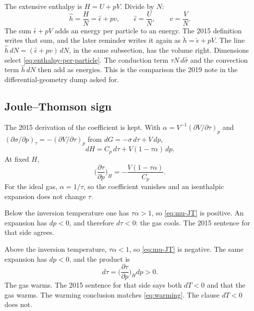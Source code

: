 The extensive enthalpy is \(H = U + pV\). Divide by \(N\):
\begin{equation}
\label{eq:enthalpy-per-particle}
\hat h = \frac{H}{N} = \hat\epsilon + p v,
\qquad
\hat\epsilon = \frac{U}{N},
\qquad
v = \frac{V}{N}.
\end{equation}
The sum \(\hat\epsilon + pV\) adds an energy per particle to an energy. The 2015 definition writes that sum, and the later reminder writes it again as \(\check h = \check\epsilon + pV\). The line \(\hat h\, dN = (\hat\epsilon + pv)\, dN\), in the same subsection, has the volume right. Dimensions select \eqref{eq:enthalpy-per-particle}. The conduction term \(\tau N\, d\hat\sigma\) and the convection term \(\hat h\, dN\) then add as energies. This is the comparison the 2019 note in the differential-geometry dump asked for.

\subsection{Joule--Thomson sign}
\label{sec:jt-sign}

The 2015 derivation of the coefficient is kept. With \(\alpha = V^{-1}(\partial V/\partial\tau)_{p}\) and \((\partial\sigma/\partial p)_{\tau} = -(\partial V/\partial\tau)_{p}\) from \(dG = -\sigma\, d\tau + V\, dp\),
\begin{equation}
\label{eq:dH-JT}
dH = C_p\, d\tau + V(1 - \tau\alpha)\, dp.
\end{equation}
At fixed \(H\),
\begin{equation}
\label{eq:mu-JT}
\biggl(\frac{\partial\tau}{\partial p}\biggr)_{H}
= -\frac{V(1-\tau\alpha)}{C_p}.
\end{equation}
For the ideal gas, \(\alpha = 1/\tau\), so the coefficient vanishes and an isenthalpic expansion does not change \(\tau\).

Below the inversion temperature one has \(\tau\alpha > 1\), so \eqref{eq:mu-JT} is positive. An expansion has \(dp<0\), and therefore \(d\tau<0\): the gas cools. The 2015 sentence for that side agrees.

Above the inversion temperature, \(\tau\alpha < 1\), so \eqref{eq:mu-JT} is negative. The same expansion has \(dp<0\), and the product is
\begin{equation}
\label{eq:warming}
d\tau = \biggl(\frac{\partial\tau}{\partial p}\biggr)_{H} dp > 0.
\end{equation}
The gas warms. The 2015 sentence for that side says both \(dT<0\) and that the gas warms. The warming conclusion matches \eqref{eq:warming}. The clause \(dT<0\) does not.

